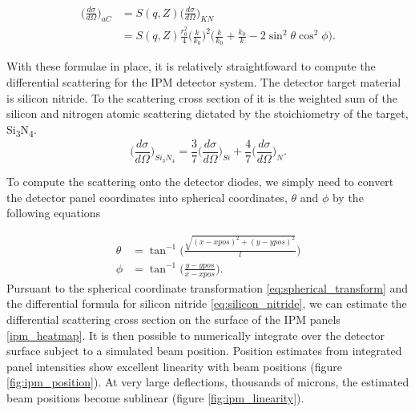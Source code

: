 \documentclass{report}
\begin{document}
\begin{equation}
\begin{aligned}
\bigg( \frac {d\sigma}{d\Omega} \bigg)_{aC} &= S(q, Z) \bigg( \frac {d\sigma}{d\Omega} \bigg)_{KN} \\
                                            &= S(q, Z)  \frac {r_0^2} {4} \bigg(\frac{k}{k_0}\bigg)^2\bigg(\frac {k} {k_0} + \frac {k_0} {k} - 2 \sin^2 \theta \cos^2 \phi \bigg).
\end{aligned}
\end{equation}

With these formulae in place, it is relatively straightfoward to compute the differential scattering for the IPM detector system. 
The detector target material is silicon nitride. 
To the scattering cross section of it is the weighted sum of the silicon and nitrogen atomic scattering dictated by the stoichiometry of the target, Si\textsubscript{3}N\textsubscript{4}.
\begin{equation} \label{eq:silicon_nitride}
\bigg( \frac {d\sigma}{d\Omega} \bigg)_{Si_3N_4} = \frac{3}{7}\bigg( \frac {d\sigma}{d\Omega} \bigg)_{Si} + \frac{4}{7}\bigg( \frac {d\sigma}{d\Omega} \bigg)_{N}.
\end{equation}

To compute the scattering onto the detector diodes, we simply need to convert the detector panel coordinates into spherical coordinates, $\theta$ and $\phi$ by the following equations

\begin{equation} \label{eq:spherical_transform}
\begin{aligned}
\theta &= \tan^{-1} {\bigg( \frac {\sqrt{(x-xpos)^2 + (y-ypos)^2}} {l} \bigg)} \\
\phi   &= \tan^{-1} \bigg(\frac {y - ypos} {x - xpos} \bigg).
\end{aligned}
\end{equation}
Pursuant to the spherical coordinate transformation \ref{eq:spherical_transform} and the differential formula for silicon nitride \ref{eq:silicon_nitride}, we can estimate the differential scattering cross section on the surface of the IPM panels \ref{ipm_heatmap}. 
It is then possible to numerically integrate over the detector surface subject to a simulated beam position. 
Position estimates from integrated panel intensities show excellent linearity with beam positions (figure \ref{fig:ipm_position}). 
At very large deflections, thousands of microns, the estimated beam positions become sublinear (figure \ref{fig:ipm_linearity}). 
\end{document}
